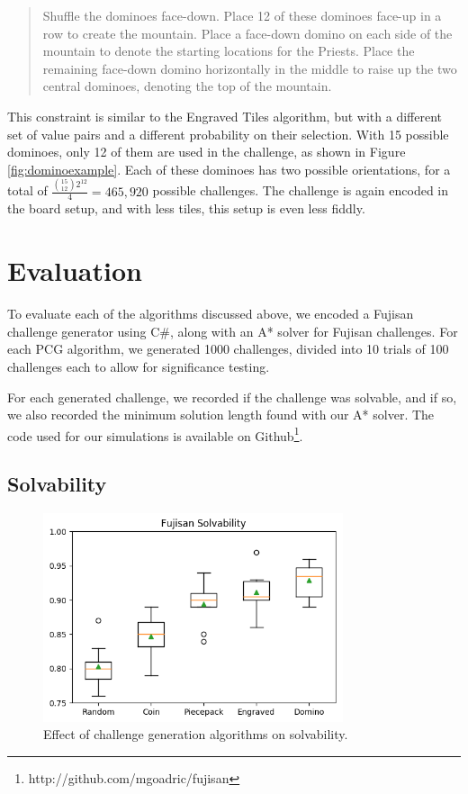 \documentclass[10pt,journal,compsoc]{IEEEtran}
\begin{document}
\begin{quote}
    
  Shuffle the dominoes face-down. Place 12 of these dominoes face-up in a row to create the mountain. Place a face-down domino on each side of the mountain to denote the starting locations for the Priests. Place the remaining face-down domino horizontally in the middle to raise up the two central dominoes, denoting the top of the mountain.
\end{quote}

This constraint is similar to the Engraved Tiles algorithm, but with a different set of value pairs and a different probability on their selection.
With 15 possible dominoes, only 12 of them are used in the challenge, as shown in Figure \ref{fig:dominoexample}. Each of these dominoes has two possible orientations, for a total of $\frac{{15 \choose 12}2^{12}}{4} = 465,920$ possible challenges. The challenge is again encoded in the board setup, and with less tiles, this setup is even less fiddly.


\section{Evaluation}

 \noindent
To evaluate each of the algorithms discussed above, we encoded a Fujisan challenge generator using C\#, along with an A* solver for Fujisan challenges. For each PCG algorithm, we generated 1000 challenges, divided into 10 trials of 100 challenges each to allow for significance testing. 

For each generated challenge, we recorded if the challenge was solvable, and if so, we also recorded the minimum solution length found with our A* solver. The code used for our simulations is available on Github\footnote{http://github.com/mgoadric/fujisan}. 


\subsection{Solvability}

\begin{figure}[t]
\includegraphics[width=8.8cm]{graphics/standalonesolve.png}
\caption{Effect of challenge generation algorithms on solvability.}
\label{fig:strategycomp}
\end{figure}
\end{document}
